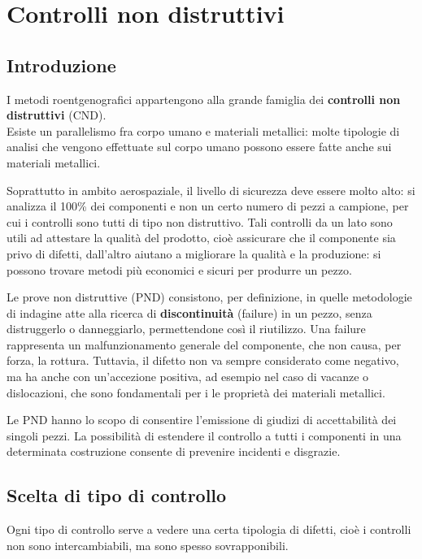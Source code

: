 \setchapterpreamble[u]{\margintoc}
\chapter{Controlli non distruttivi}

\section{Introduzione}

I metodi roentgenografici appartengono alla grande famiglia dei \textbf{controlli non distruttivi} (CND).\\
Esiste un parallelismo fra corpo umano e materiali metallici: molte tipologie di analisi che vengono effettuate sul corpo umano possono essere fatte anche sui materiali metallici.

Soprattutto in ambito aerospaziale, il livello di sicurezza deve essere molto alto: si analizza il 100\% dei componenti e non un certo numero di pezzi a campione, per cui i controlli sono tutti di tipo non distruttivo. Tali controlli da un lato sono utili ad attestare la qualità del prodotto, cioè assicurare che il componente sia privo di difetti, dall’altro aiutano a migliorare la qualità e la produzione: si possono trovare metodi più economici e sicuri per produrre un pezzo.

Le prove non distruttive (PND) consistono, per definizione, in quelle metodologie di indagine atte alla ricerca di \textbf{discontinuità} (failure) in un pezzo, senza distruggerlo o danneggiarlo, permettendone così il riutilizzo. Una failure rappresenta un malfunzionamento generale del componente, che non causa, per forza, la rottura. Tuttavia, il difetto non va sempre considerato come negativo, ma ha anche con un’accezione positiva, ad esempio nel caso di vacanze o dislocazioni, che sono fondamentali per i le proprietà dei materiali metallici.

Le PND hanno lo scopo di consentire l’emissione di giudizi di accettabilità dei singoli pezzi. La possibilità di estendere il controllo a tutti i componenti in una determinata costruzione consente di prevenire incidenti e disgrazie.

\section{Scelta di tipo di controllo}

Ogni tipo di controllo serve a vedere una certa tipologia di difetti, cioè i controlli non sono intercambiabili, ma sono spesso sovrapponibili.

